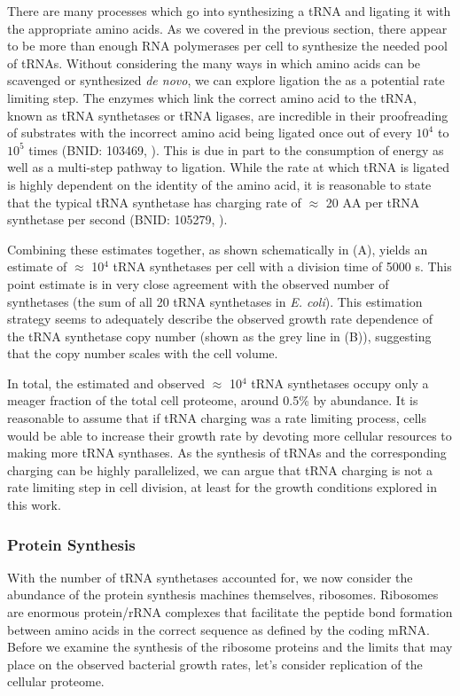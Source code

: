 There  are many processes which go into synthesizing a tRNA and ligating it
with the appropriate amino acids. As we covered  in the previous section, there
appear to be more than enough RNA polymerases per cell to synthesize the needed
pool of tRNAs. Without considering the many ways in which amino acids can be
scavenged or synthesized \textit{de novo}, we can explore ligation the as a potential rate limiting
step. The enzymes which link the correct amino acid to the tRNA, known as tRNA
synthetases or tRNA ligases, are incredible in their proofreading of substrates
with the incorrect amino acid being ligated once out of every $10^4$ to $10^5$
times (BNID: 103469, \cite{milo2010}). This is due in part to the consumption of
energy  as well as a multi-step pathway to ligation. While the rate at which
tRNA is ligated is highly dependent on the identity of the amino acid, it is
reasonable to state that the typical tRNA synthetase has charging rate of
$\approx$ 20 AA per tRNA synthetase per second (BNID: 105279, \cite{milo2010}).

Combining these estimates together, as shown schematically in
(A), yields an estimate of $\approx$ 10$^4$ tRNA
synthetases per cell with a division time of 5000 s. This point estimate is in
very close agreement with the observed number of synthetases (the sum of all 20
tRNA synthetases in \textit{E. coli}). This estimation strategy seems to
adequately describe the observed growth rate dependence of the tRNA synthetase copy
number (shown as the grey line in (B)), suggesting that
the copy number scales with the cell volume.

In total, the estimated and observed $\approx$ 10$^4$ tRNA synthetases occupy
only a meager fraction of the total cell proteome, around 0.5\% by abundance. It
is reasonable to assume that if tRNA charging was a rate limiting process, cells
would be able to increase their growth rate by devoting more cellular resources
to making more tRNA synthases. As the synthesis of tRNAs and the corresponding
charging can be highly parallelized, we can argue that tRNA charging is not a
rate limiting step in cell division, at least for the growth conditions explored
in this work.

\subsubsection{Protein Synthesis}
With the number of tRNA synthetases accounted for, we now consider the abundance
of the protein synthesis machines themselves, ribosomes. Ribosomes are enormous
protein/rRNA complexes that facilitate the peptide bond formation between amino
acids in the correct sequence as defined by the coding mRNA. Before we examine
the synthesis of the ribosome proteins and the limits that may place on the
observed bacterial growth rates, let's consider replication of the cellular
proteome.

